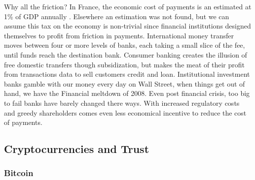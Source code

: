 \documentclass[a4paper,12pt]{article} %
\begin{document}
Why all the friction? In France, the economic cost of payments is an estimated at 1\% of GDP annually \cite{kaarmann2013cost}. Elsewhere an estimation was not found, but we can assume this tax on the economy is non-trivial since financial institutions designed themselves to profit from friction in payments. International money transfer moves between four or more levels of banks, each taking a small slice of the fee, until funds reach the destination bank. Consumer banking creates the illusion of free domestic transfers though subsidization, but makes the meat of their profit from transactions data to sell customers credit and loan. Institutional investment banks gamble with our money every day on Wall Street, when things get out of hand, we have the Financial meltdown of 2008. Even post financial crisis, too big to fail banks have barely changed there ways. With increased regulatory costs and greedy shareholders comes even less economical incentive to reduce the cost of payments.

\subsection{Cryptocurrencies and Trust} \label{ssec:2:cryptocurrencies}

\subsubsection{Bitcoin} \label{sssec:2:bitcoin}
\end{document}
